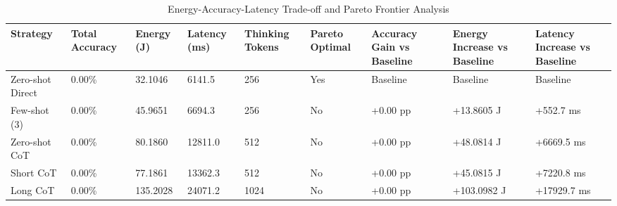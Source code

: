 \begin{table}
\caption{Energy-Accuracy-Latency Trade-off and Pareto Frontier Analysis}
\label{tab:tradeoff_comparison}
\begin{tabular}{lllllllll}
\toprule
Strategy & Total Accuracy & Energy (J) & Latency (ms) & Thinking Tokens & Pareto Optimal & Accuracy Gain vs Baseline & Energy Increase vs Baseline & Latency Increase vs Baseline \\
\midrule
Zero-shot Direct & 0.00\% & 32.1046 & 6141.5 & 256 & Yes & Baseline & Baseline & Baseline \\
Few-shot (3) & 0.00\% & 45.9651 & 6694.3 & 256 & No & +0.00 pp & +13.8605 J & +552.7 ms \\
Zero-shot CoT & 0.00\% & 80.1860 & 12811.0 & 512 & No & +0.00 pp & +48.0814 J & +6669.5 ms \\
Short CoT & 0.00\% & 77.1861 & 13362.3 & 512 & No & +0.00 pp & +45.0815 J & +7220.8 ms \\
Long CoT & 0.00\% & 135.2028 & 24071.2 & 1024 & No & +0.00 pp & +103.0982 J & +17929.7 ms \\
\bottomrule
\end{tabular}
\end{table}

